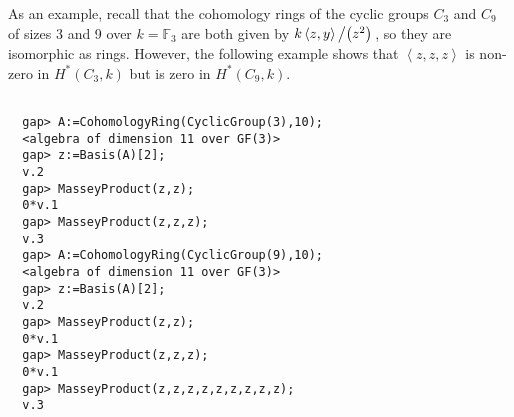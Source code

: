 \documentclass[a4paper,11pt]{report}
\begin{document}
{{ As an example, recall that the cohomology rings of the cyclic groups $C_3$ and $C_9$ of sizes 3 and 9 over $k=\mathbb{F}_3$  are both given by  $k\left\langle z, y\right\rangle\left/\left(z^2\right)\right.$,  so they are isomorphic as rings. However, the following example shows that  $\left\langle z,z,z\right\rangle$  is non-zero in $H^\ast\left(C_3,k\right)$  but is zero in $H^\ast\left(C_9,k\right)$.  
\begin{Verbatim}[fontsize=\small,frame=single,label=Example]
  
  gap> A:=CohomologyRing(CyclicGroup(3),10);
  <algebra of dimension 11 over GF(3)>
  gap> z:=Basis(A)[2];
  v.2
  gap> MasseyProduct(z,z);
  0*v.1
  gap> MasseyProduct(z,z,z);
  v.3
  gap> A:=CohomologyRing(CyclicGroup(9),10);
  <algebra of dimension 11 over GF(3)>
  gap> z:=Basis(A)[2];
  v.2
  gap> MasseyProduct(z,z);
  0*v.1
  gap> MasseyProduct(z,z,z);
  0*v.1
  gap> MasseyProduct(z,z,z,z,z,z,z,z,z);
  v.3
  
\end{Verbatim}
 }

 }

 

\appendix
\end{document}
